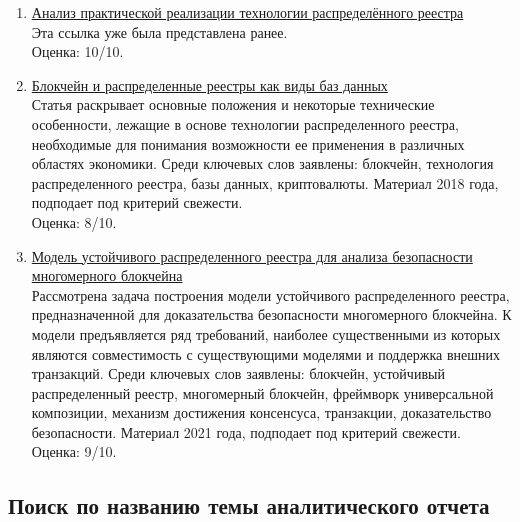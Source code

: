 \documentclass[a4paper, 12pt]{report}		%
\begin{document}
\begin{enumerate}
\item \href{https://elibrary.ru/item.asp?id=44065996}{Анализ практической реализации технологии распределённого реестра}\\
Эта ссылка уже была представлена ранее.\\
Оценка: 10/10.
\item \href{https://cyberleninka.ru/article/n/blokcheyn-i-raspredelennye-reestry-kak-vidy-baz-dannyh}{Блокчейн и распределенные реестры как виды баз данных}\\
Статья раскрывает основные положения и некоторые технические особенности, лежащие в основе технологии распределенного реестра, необходимые для понимания возможности ее применения в различных областях экономики. Среди ключевых слов заявлены: блокчейн, технология распределенного реестра, базы данных, криптовалюты. Материал 2018 года, подподает под критерий свежести.\\
Оценка: 8/10.
\item \href{https://cyberleninka.ru/article/n/model-ustoychivogo-raspredelennogo-reestra-dlya-analiza-bezopasnosti-mnogomernogo-blokcheyna}{Модель устойчивого распределенного реестра для анализа безопасности многомерного блокчейна}\\
Рассмотрена задача построения модели устойчивого распределенного реестра, предназначенной для доказательства безопасности многомерного блокчейна. К модели предъявляется ряд требований, наиболее существенными из которых являются совместимость с существующими моделями и поддержка внешних транзакций. Среди ключевых слов заявлены: блокчейн, устойчивый распределенный реестр, многомерный блокчейн, фреймворк универсальной композиции, механизм достижения консенсуса, транзакции, доказательство безопасности. Материал 2021 года, подподает под критерий свежести.\\
Оценка: 9/10.
\end{enumerate}

\subsection*{Поиск по названию темы аналитического отчета}
\end{document}
